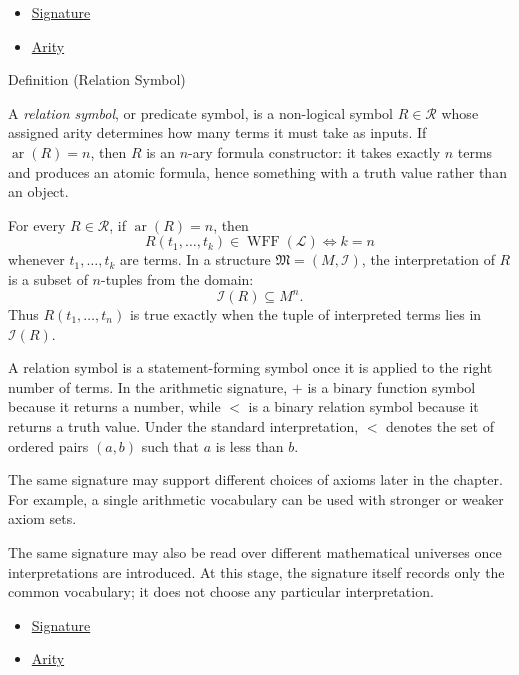 \begin{dependencies}
\begin{itemize}
  \item \hyperref[def:signature]{Signature}
  \item \hyperref[def:arity]{Arity}
\end{itemize}
\end{dependencies}

\begin{definitionbox}{Definition (Relation Symbol)}
\begin{definition}
\label{def:relation-symbol}
A \emph{relation symbol}, or predicate symbol, is a non-logical symbol
$R\in\mathcal{R}$ whose assigned arity determines how many terms it must take
as inputs. If $\operatorname{ar}(R)=n$, then $R$ is an $n$-ary formula
constructor: it takes exactly $n$ terms and produces an atomic formula, hence
something with a truth value rather than an object.
\end{definition}
\end{definitionbox}

\begin{remark*}
For every $R\in\mathcal{R}$, if $\operatorname{ar}(R)=n$, then
\[
  R(t_1,\ldots,t_k)\in\operatorname{WFF}(\mathcal{L})
  \iff k=n
\]
whenever $t_1,\ldots,t_k$ are terms. In a structure
$\mathfrak{M}=(M,\mathcal{I})$, the interpretation of $R$ is a subset of
$n$-tuples from the domain:
\[
  \mathcal{I}(R)\subseteq M^n.
\]
Thus $R(t_1,\ldots,t_n)$ is true exactly when the tuple of interpreted terms
lies in $\mathcal{I}(R)$.
\end{remark*}

\begin{remark*}[Interpretation]
A relation symbol is a statement-forming symbol once it is applied to the
right number of terms. In the arithmetic signature, $+$ is a binary function
symbol because it returns a number, while $<$ is a binary relation symbol
because it returns a truth value. Under the standard interpretation,
$<$ denotes the set of ordered pairs $(a,b)$ such that $a$ is less than $b$.
\end{remark*}

\begin{remark*}[Exposition]
The same signature may support different choices of axioms later in the
chapter. For example, a single arithmetic vocabulary can be used with stronger
or weaker axiom sets.

The same signature may also be read over different mathematical universes once
interpretations are introduced. At this stage, the signature itself records
only the common vocabulary; it does not choose any particular interpretation.
\end{remark*}


\begin{dependencies}
\begin{itemize}
  \item \hyperref[def:signature]{Signature}
  \item \hyperref[def:arity]{Arity}
\end{itemize}
\end{dependencies}

